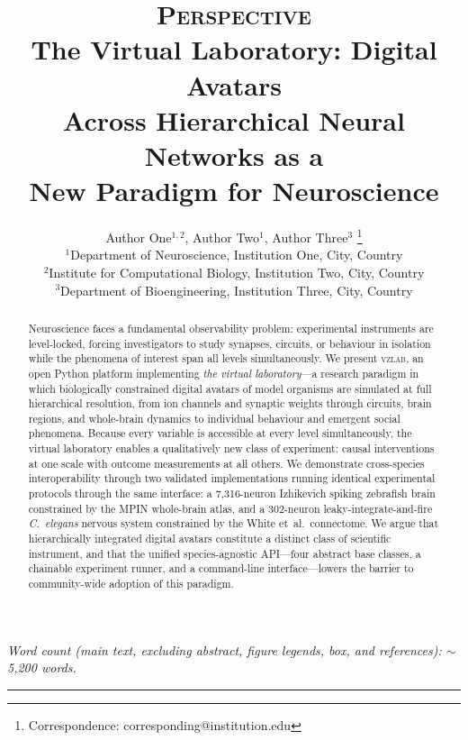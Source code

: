 \documentclass[12pt,a4paper]{article}
\title{%
  \vspace{-1.5cm}
  {\large\textsc{Perspective}}\\[8pt]
  \LARGE\bfseries
  The Virtual Laboratory: Digital Avatars\\
  Across Hierarchical Neural Networks as a\\
  New Paradigm for Neuroscience
}
\author{%
  Author One$^{1,2}$,
  Author Two$^{1}$,
  Author Three$^{3}$%
  \thanks{Correspondence: corresponding@institution.edu}
  \\[6pt]
  \small$^{1}$Department of Neuroscience, Institution One, City, Country\\
  \small$^{2}$Institute for Computational Biology, Institution Two, City, Country\\
  \small$^{3}$Department of Bioengineering, Institution Three, City, Country
}
\date{}  %
\begin{document}
\maketitle
\thispagestyle{empty}

{\small\noindent\textit{Word count (main text, excluding abstract,
figure legends, box, and references): $\sim$5{,}200 words.}}
\vspace{6pt}

\begin{abstract}
\noindent
Neuroscience faces a fundamental observability problem: experimental
instruments are level-locked, forcing investigators to study synapses,
circuits, or behaviour in isolation while the phenomena of interest
span all levels simultaneously.
We present \textsc{vzlab}, an open Python platform implementing
\emph{the virtual laboratory}---a research paradigm in which
biologically constrained digital avatars of model organisms are
simulated at full hierarchical resolution, from ion channels and
synaptic weights through circuits, brain regions, and whole-brain
dynamics to individual behaviour and emergent social phenomena.
Because every variable is accessible at every level simultaneously,
the virtual laboratory enables a qualitatively new class of experiment:
causal interventions at one scale with outcome measurements at all
others.
We demonstrate cross-species interoperability through two validated
implementations running identical experimental protocols through the
same interface: a 7,316-neuron Izhikevich spiking zebrafish brain
constrained by the MPIN whole-brain atlas, and a 302-neuron
leaky-integrate-and-fire \textit{C.~elegans} nervous system
constrained by the White et~al.\ connectome.
We argue that hierarchically integrated digital avatars constitute a
distinct class of scientific instrument, and that the unified
species-agnostic API---four abstract base classes, a chainable
experiment runner, and a command-line interface---lowers the barrier
to community-wide adoption of this paradigm.
\end{abstract}

\vspace{4pt}
\noindent\rule{\linewidth}{0.4pt}
\vspace{2pt}

\end{document}
